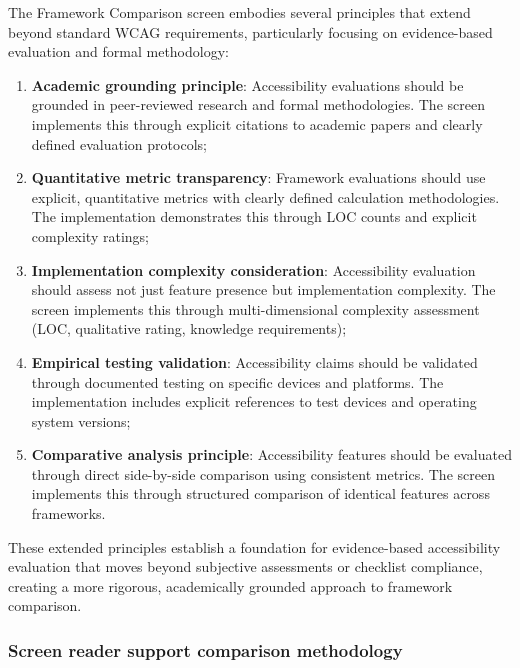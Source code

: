 The Framework Comparison screen embodies several principles that extend beyond standard WCAG requirements, particularly focusing on evidence-based evaluation and formal methodology:

\begin{enumerate}
    \item \textbf{Academic grounding principle}: Accessibility evaluations should be grounded in peer-reviewed research and formal methodologies. The screen implements this through explicit citations to academic papers and clearly defined evaluation protocols;
    
    \item \textbf{Quantitative metric transparency}: Framework evaluations should use explicit, quantitative metrics with clearly defined calculation methodologies. The implementation demonstrates this through LOC counts and explicit complexity ratings;
    
    \item \textbf{Implementation complexity consideration}: Accessibility evaluation should assess not just feature presence but implementation complexity. The screen implements this through multi-dimensional complexity assessment (LOC, qualitative rating, knowledge requirements);
    
    \item \textbf{Empirical testing validation}: Accessibility claims should be validated through documented testing on specific devices and platforms. The implementation includes explicit references to test devices and operating system versions;
    
    \item \textbf{Comparative analysis principle}: Accessibility features should be evaluated through direct side-by-side comparison using consistent metrics. The screen implements this through structured comparison of identical features across frameworks.
\end{enumerate}

These extended principles establish a foundation for evidence-based accessibility evaluation that moves beyond subjective assessments or checklist compliance, creating a more rigorous, academically grounded approach to framework comparison.

\subsubsection{Screen reader support comparison methodology}

